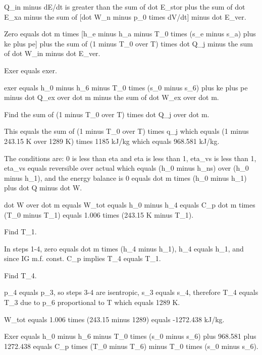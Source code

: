 Q_in minus dE/dt is greater than the sum of dot E_stor plus the sum of dot E_xa minus the sum of [dot W_n minus p_0 times dV/dt] minus dot E_ver. 

Zero equals dot m times [h_e minus h_a minus T_0 times (s_e minus s_a) plus ke plus pe] plus the sum of (1 minus T_0 over T) times dot Q_j minus the sum of dot W_in minus dot E_ver.

Exer equals exer.

exer equals h_0 minus h_6 minus T_0 times (s_0 minus s_6) plus ke plus pe minus dot Q_ex over dot m minus the sum of dot W_ex over dot m.

Find the sum of (1 minus T_0 over T) times dot Q_j over dot m.

This equals the sum of (1 minus T_0 over T) times q_j which equals (1 minus 243.15 K over 1289 K) times 1185 kJ/kg which equals 968.581 kJ/kg.

The conditions are: 0 is less than eta and eta is less than 1, eta_vs is less than 1, eta_vs equals reversible over actual which equals (h_0 minus h_ns) over (h_0 minus h_1), and the energy balance is 0 equals dot m times (h_0 minus h_1) plus dot Q minus dot W.

dot W over dot m equals W_tot equals h_0 minus h_4 equals C_p dot m times (T_0 minus T_1) equals 1.006 times (243.15 K minus T_1).

Find T_1.

In steps 1-4, zero equals dot m times (h_4 minus h_1), h_4 equals h_1, and since IG m.f. const. C_p implies T_4 equals T_1.

Find T_4.

p_4 equals p_3, so steps 3-4 are isentropic, s_3 equals s_4, therefore T_4 equals T_3 due to p_6 proportional to T which equals 1289 K.

W_tot equals 1.006 times (243.15 minus 1289) equals -1272.438 kJ/kg.

Exer equals h_0 minus h_6 minus T_0 times (s_0 minus s_6) plus 968.581 plus 1272.438 equals C_p times (T_0 minus T_6) minus T_0 times (s_0 minus s_6).